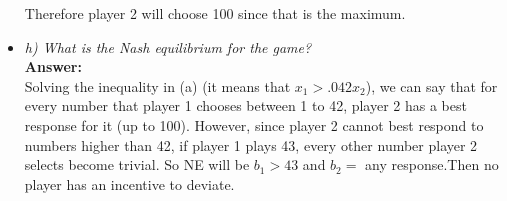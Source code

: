 \documentclass{report}
\begin{document}
\begin{itemize}
Therefore player 2 will choose 100 since that is the maximum.\\
\item[]\textit{h) What is the Nash equilibrium for the game?}\\

\textbf{Answer:}\\

Solving the inequality in (a) (it means that $x_1 >.042x_2$), we can say that for every number that player 1 chooses between 1 to 42, player 2 has a best response for it (up to 100). However, since player 2 cannot best respond to numbers higher than 42, if player 1 plays 43, every other number player 2 selects become trivial. So NE will be $b_1>43$ and $b_2=$ any response.Then no player has an incentive to deviate.\\


\end{itemize}








 
     
     
\end{document}
